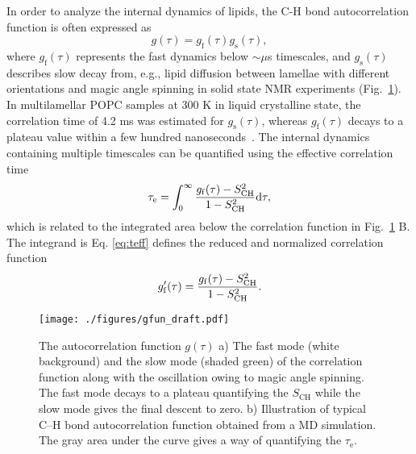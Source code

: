 \documentclass[journal=jpcbfk,manuscript=article,layout=twocolumn]{achemso}
\begin{document}
In order to analyze the internal dynamics of lipids, 
the C-H bond autocorrelation function is often expressed as %
\begin{equation}
g(\tau)=g_{\mathrm{f}}(\tau)g_{\mathrm{s}}(\tau) ,
\end{equation} 
where $g_{\mathrm{f}}(\tau)$ represents the fast dynamics below $\sim \mu$s timescales, %
and $g_{\mathrm{s}}(\tau)$ describes slow decay from, e.g., lipid diffusion between lamellae with different orientations and
magic angle spinning in solid state NMR experiments (Fig.~\ref{fig:schem_teff}).
In multilamellar POPC samples at 300 K in liquid crystalline state, the correlation time of 4.2 ms was estimated for $g_{\mathrm{s}}(\tau)$,
whereas $g_{\mathrm{f}}(\tau)$ decays to a plateau value  within a few hundred nanoseconds~\cite{ferreira15}.
The internal dynamics containing multiple timescales can be quantified using the effective correlation time
\begin{equation}
\label{eq:teff}
\tau_\mathrm{e}=\int_{0}^{\infty}\frac{g_{\mathrm{f}}(\tau)-S^{2}_{\rm{CH}}}{1-S^2_{\mathrm{CH}}}\mathrm d\tau,
\end{equation}
which is related to the integrated area below the correlation function in Fig.~\ref{fig:schem_teff} B.
The integrand is Eq. \ref{eq:teff} defines the reduced and normalized correlation function
\begin{equation}
\label{eq:nBCF}
g'_{\mathrm{f}}(\tau)=\frac{g_{\mathrm{f}}(\tau)-S^{2}_{\rm{CH}}}{1-S^2_{\mathrm{CH}}}.
\end{equation}

\begin{figure}[t]
\texttt{[image: ./figures/gfun\_draft.pdf]} 
\caption{The autocorrelation function $g(\tau)$ a) The fast mode (white background) and the slow mode (shaded green) of the correlation function along with the oscillation owing to magic angle spinning. The fast mode decays to a plateau quantifying the $S_{\mathrm{CH}}$ while the slow mode gives the final descent to zero. b) Illustration of typical C--H bond autocorrelation function obtained from a MD simulation. The gray area under the curve gives a way of quantifying the $\tau_\mathrm{e}$. }
\label{fig:schem_teff}

\end{figure} 
\end{document}
